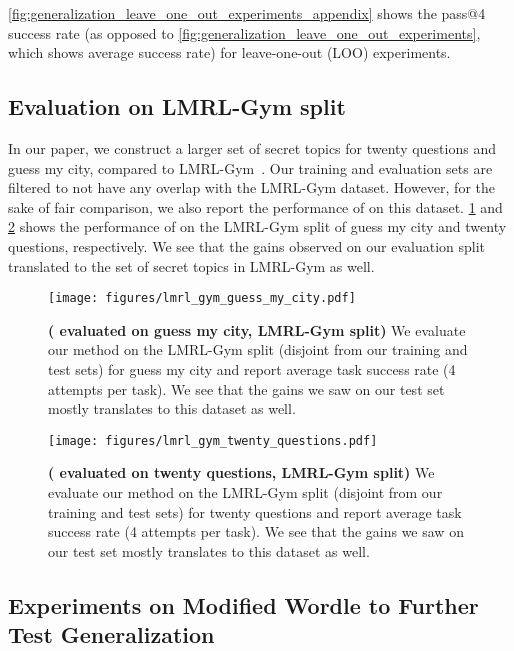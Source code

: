 \cref{fig:generalization_leave_one_out_experiments_appendix} shows the pass@4 success rate (as opposed to \cref{fig:generalization_leave_one_out_experiments}, which shows average success rate) for leave-one-out (LOO) experiments.
 

\subsection{Evaluation on LMRL-Gym split}

In our paper, we construct a larger set of secret topics for twenty questions and guess my city, compared to LMRL-Gym~\citep{abdulhai2023lmrl}. Our training and evaluation sets are filtered to not have any overlap with the LMRL-Gym dataset. However, for the sake of fair comparison, we also report the performance of \ours{} on this dataset. \cref{fig:lmrl_gym_guess_my_city} and \cref{fig:lmrl_gym_twenty_questions} shows the performance of \ours{} on the LMRL-Gym split of guess my city and twenty questions, respectively. We see that the gains observed on our evaluation split translated to the set of secret topics in LMRL-Gym as well.

\begin{figure}[h!]
    \centering
    \texttt{[image: figures/lmrl\_gym\_guess\_my\_city.pdf]}
    \caption{\textbf{(\ours{} evaluated on guess my city, LMRL-Gym split)} We evaluate our method on the LMRL-Gym split (disjoint from our training and test sets) for guess my city and report average task success rate (4 attempts per task). We see that the gains we saw on our test set mostly translates to this dataset as well.}
    \label{fig:lmrl_gym_guess_my_city}
\end{figure}

\begin{figure}[h!]
    \centering
    \texttt{[image: figures/lmrl\_gym\_twenty\_questions.pdf]}
    \caption{\textbf{(\ours{} evaluated on twenty questions, LMRL-Gym split)} We evaluate our method on the LMRL-Gym split (disjoint from our training and test sets) for twenty questions and report average task success rate (4 attempts per task). We see that the gains we saw on our test set mostly translates to this dataset as well.}
    \label{fig:lmrl_gym_twenty_questions}
\end{figure}

\subsection{Experiments on Modified Wordle to Further Test Generalization}

